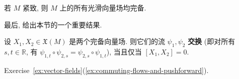 \begin{RiemannCorollary}\label{cor:completeness-on-compact-manifolds}
若 $M$ 紧致, 则 $M$ 上的所有光滑向量场均完备.\hfill\openbox
\end{RiemannCorollary}

最后, 给出本节的一个重要结果.

\begin{RiemannTheorem}\label{thm:commuting-flows-and-lie-brackets}
设 $X_1,X_2\in\mathfrak{X}(M)$ 是两个完备向量场. 则它们的流 $\psi_1,\psi_2$ \textbf{交换} (即对所有 $s,t\in\mathbb{R}$, 有 $\psi_{1,t}\circ\psi_{2,s}=\psi_{2,s}\circ\psi_{1,t}$), 当且仅当 $[X_1,X_2]=0$.
\end{RiemannTheorem}

\begin{RiemannProof}
Exercise~\ref{ex:vector-fields}(\ref{ex:commuting-flows-and-pushforward}).
\end{RiemannProof}

